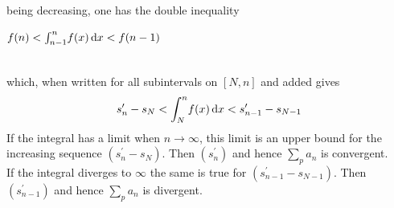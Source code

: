\documentclass[reqno]{amsbook}
\begin{document}
    being decreasing, one has the double inequality\\
    \begin{center}
        $f(n)<\int_{n-1}^{n} \! f(x) \, \mathrm{d} x < f(n-1)$\\~\\
    \end{center}
    which, when written for all subintervals on $[N, n]$ and added gives\\
    \[
        {s_{n}^\prime} - s_{N} < \int_{N}^{n} \! f(x) \, \mathrm{d} x < s_{n-1}^\prime - s_{N-1}
    \]
    \indent If the integral has a limit when $n \to \infty$, this limit is an upper bound for the increasing sequence $({s_{n}^\prime} - s_{N})$. Then $({s_{n}^\prime})$ and hence $\sum_{p} a_{n}$ is convergent.\\
    \indent If the integral diverges to $\infty$ the same is true for $(s_{n-1}^\prime - s_{N-1})$. Then $(s_{n-1}^\prime)$ and hence $\sum_{p}^{} a_{n}$ is divergent.
\end{document}
